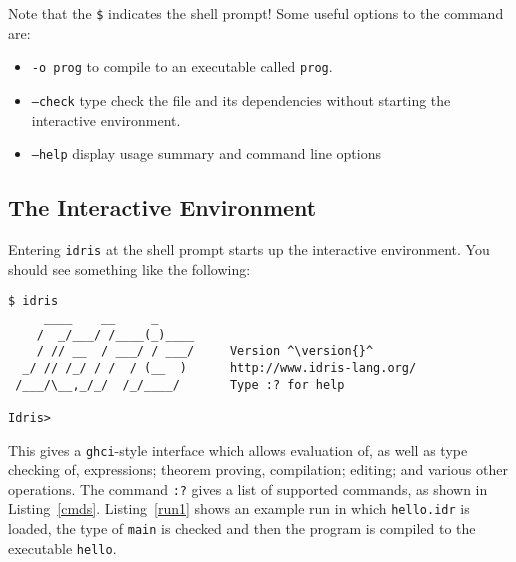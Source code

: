 \noindent
Note that the \texttt{\$} indicates the shell prompt! Some useful options to the \Idris{} command are:

\begin{itemize}
\item \texttt{-o prog} to compile to an executable called \texttt{prog}.
\item \texttt{--check} type check the file and its dependencies without starting the 
interactive environment.
\item \texttt{--help} display usage summary and command line options
\end{itemize}

\subsection{The Interactive Environment}

Entering \texttt{idris} at the shell prompt starts up the interactive environment.
You should see something like the following:

\begin{lstlisting}[escapechar=^]
$ idris
     ____    __     _                                          
    /  _/___/ /____(_)____                                     
    / // __  / ___/ / ___/     Version ^\version{}^
  _/ // /_/ / /  / (__  )      http://www.idris-lang.org/      
 /___/\__,_/_/  /_/____/       Type :? for help      

Idris>
\end{lstlisting}

\noindent
This gives a \texttt{ghci}-style interface which allows evaluation of, as well as type checking of, expressions; theorem proving, compilation; editing; and various other operations.
The command \texttt{:?} gives a list of supported commands, as shown in Listing~\ref{cmds}.
Listing~\ref{run1} shows an example run in which \texttt{hello.idr} is loaded, the type of \texttt{main} is checked and then the program is compiled to the executable \texttt{hello}.

